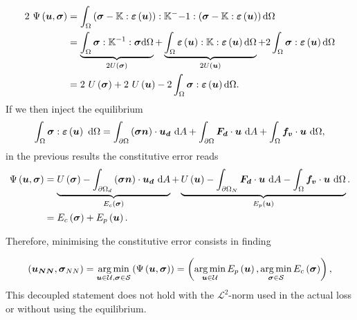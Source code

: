 \begin{equation}
	\begin{split}
			2~\Psi\left(\vect{u},\sigm\right) & =  \intV \left(\sigm - \ftensor{K}:\eps\left(\vect{u}\right)\right) : \ftensor{K}^-{-1}:\left(\sigm - \ftensor{K}:\eps\left(\vect{u}\right)\right) \dV\\ 
			& = \underbrace{\intV \sigm: \ftensor{K}^{-1}: \sigm \dV}_{2U\left(\sigm\right)} + \underbrace{\intV \eps\left(\vect{u}\right):\ftensor{K}:\eps\left(\vect{u}\right) \dV}_{2U\left(\vect{u}\right)}+ 2\intV\sigm:\eps\left(\vect{u}\right)\dV\\
			& = 2~ U\left(\sigm\right) +2~ U\left(\vect{u}\right) - 2\intV\sigm:\eps\left(\vect{u}\right)\dV.\\
	\end{split}
\end{equation}
If we then inject the equilibrium 
\begin{equation}
	\intV\sigm:\eps\left(\vect{u}\right)~\dV = \intS \left(\sigm\vect{n}\right) \cdot \vect{u_d}~\dS +  \intS \vect{F_d}\cdot \vect{u} ~\dS +\intV \vect{f_v}\cdot\vect{u}~\dV,
\end{equation}
in the previous results the constitutive error reads 
\begin{equation}
		\begin{split}
			\Psi\left(\vect{u},\sigm\right)  & = \underbrace{U\left(\sigm\right) - \intSd \left(\sigm\vect{n}\right) \cdot \vect{u_d}~\dS }_{E_c\left(\sigm\right)} +\underbrace{U\left(\vect{u}\right) -  \intSn \vect{F_d}\cdot \vect{u} ~\dS -\intV \vect{f_v}\cdot\vect{u}~\dV}_{E_p\left(\vect{u}\right)}.\\
			& =E_c\left(\sigm\right)+E_p\left(\vect{u}\right).
		\end{split}
\end{equation}

Therefore, minimising the constitutive error consists in finding 

\begin{equation}
	\left(\vect{u_{NN}},\sigm_{NN}\right) = \argmin_{\vect{u}\in \mathcal{U}, \sigm \in \mathcal{S}} \left(\Psi\left(\vect{u},\sigm\right)\right) =  \left(\argmin_{\vect{u}\in \mathcal{U}}E_p\left(\vect{u}\right),\argmin_{\sigm\in \mathcal{S}}E_c\left(\sigm\right)\right),
\end{equation}
This decoupled statement does not hold with the $\mathcal{L}^2$-norm used in the actual loss or without using the equilibrium.



